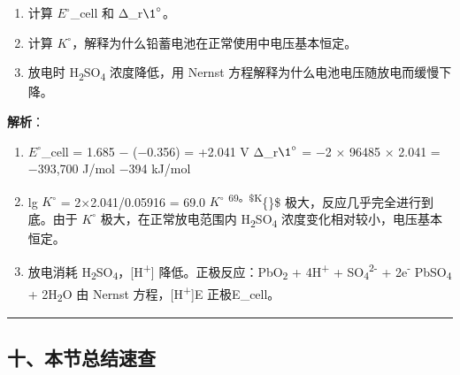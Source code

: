 \begin{enumerate}
\def\labelenumi{(\alph{enumi})}
\tightlist
\item
  计算 \(E^{\circ}\)\_cell 和 Δ\_r\(\1^{\circ}\)。
\item
  计算 \(K^{\circ}\)，解释为什么铅蓄电池在正常使用中电压基本恒定。
\item
  放电时 H\textsubscript{2}SO\textsubscript{4} 浓度降低，用 Nernst 方程解释为什么电池电压随放电而缓慢下降。
\end{enumerate}

\textbf{解析}：

\begin{enumerate}
\def\labelenumi{(\alph{enumi})}
\item
  \(E^{\circ}\)\_cell = 1.685 − (−0.356) = +2.041 V
  Δ\_r\(\1^{\circ}\) = −2 × 96485 × 2.041 = −393,700 J/mol  −394 kJ/mol
\item
  lg \(K^{\circ}\) = 2×2.041/0.05916 = 69.0 \箭 \(K^{\circ}\) \textsuperscript{69。\$K}\{\circ\}\$ 极大，反应几乎完全进行到底。由于 \(K^{\circ}\) 极大，在正常放电范围内 H\textsubscript{2}SO\textsubscript{4} 浓度变化相对较小，电压基本恒定。
\item
  放电消耗 H\textsubscript{2}SO\textsubscript{4}，{[}H\textsuperscript{+}{]} 降低。正极反应：PbO\textsubscript{2} + 4H\textsuperscript{+} + SO\textsubscript{4}\textsuperscript{2-} + 2e\textsuperscript{-} \箭 PbSO\textsubscript{4} + 2H\textsubscript{2}O
  由 Nernst 方程，{[}H\textsuperscript{+}{]} \箭 E 正极 \箭 E\_cell。
\end{enumerate}

\begin{center}\rule{0.5\linewidth}{0.5pt}\end{center}

\subsection{十、本节总结速查}\label{ux5341ux672cux8282ux603bux7ed3ux901fux67e5}

